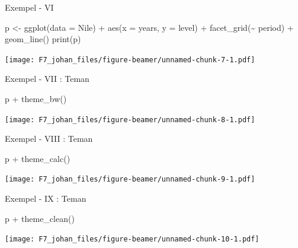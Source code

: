 \documentclass[
  11pt,
  ignorenonframetext,
  handout]{beamer}
\newenvironment{Shaded}{\begin{snugshade}}{\end{snugshade}}
\newcommand{\AttributeTok}[1]{\textcolor[rgb]{0.77,0.63,0.00}{#1}}
\newcommand{\FunctionTok}[1]{\textcolor[rgb]{0.00,0.00,0.00}{#1}}
\newcommand{\NormalTok}[1]{#1}
\newcommand{\OtherTok}[1]{\textcolor[rgb]{0.56,0.35,0.01}{#1}}
\newcommand{\SpecialCharTok}[1]{\textcolor[rgb]{0.00,0.00,0.00}{#1}}
\begin{document}
\begin{frame}[fragile]{Exempel - VI}
\protect\hypertarget{exempel---vi}{}
\begin{Shaded}
\begin{Highlighting}[]
\NormalTok{p }\OtherTok{\textless{}{-}} \FunctionTok{ggplot}\NormalTok{(}\AttributeTok{data =}\NormalTok{ Nile) }\SpecialCharTok{+} 
  \FunctionTok{aes}\NormalTok{(}\AttributeTok{x =}\NormalTok{ years, }\AttributeTok{y =}\NormalTok{ level) }\SpecialCharTok{+} 
  \FunctionTok{facet\_grid}\NormalTok{(}\SpecialCharTok{\textasciitilde{}}\NormalTok{ period) }\SpecialCharTok{+} 
  \FunctionTok{geom\_line}\NormalTok{()}
\FunctionTok{print}\NormalTok{(p)}
\end{Highlighting}
\end{Shaded}

\texttt{[image: F7\_johan\_files/figure-beamer/unnamed-chunk-7-1.pdf]}
\end{frame}

\begin{frame}[fragile]{Exempel - VII : Teman}
\protect\hypertarget{exempel---vii-teman}{}
\begin{Shaded}
\begin{Highlighting}[]
\NormalTok{p }\SpecialCharTok{+} \FunctionTok{theme\_bw}\NormalTok{()}
\end{Highlighting}
\end{Shaded}

\texttt{[image: F7\_johan\_files/figure-beamer/unnamed-chunk-8-1.pdf]}
\end{frame}

\begin{frame}[fragile]{Exempel - VIII : Teman}
\protect\hypertarget{exempel---viii-teman}{}
\begin{Shaded}
\begin{Highlighting}[]
\NormalTok{p }\SpecialCharTok{+} \FunctionTok{theme\_calc}\NormalTok{()}
\end{Highlighting}
\end{Shaded}

\texttt{[image: F7\_johan\_files/figure-beamer/unnamed-chunk-9-1.pdf]}
\end{frame}

\begin{frame}[fragile]{Exempel - IX : Teman}
\protect\hypertarget{exempel---ix-teman}{}
\begin{Shaded}
\begin{Highlighting}[]
\NormalTok{p }\SpecialCharTok{+} \FunctionTok{theme\_clean}\NormalTok{()}
\end{Highlighting}
\end{Shaded}

\texttt{[image: F7\_johan\_files/figure-beamer/unnamed-chunk-10-1.pdf]}
\end{frame}
\end{document}
